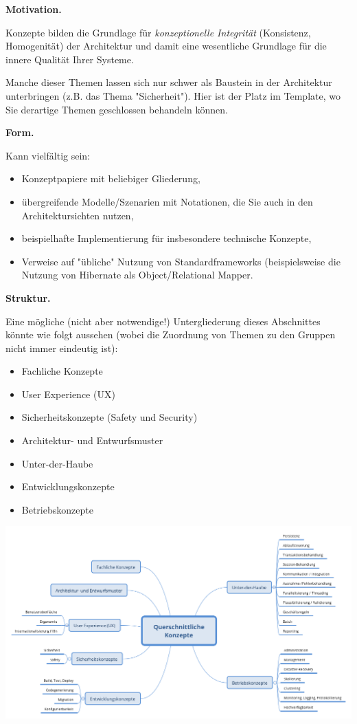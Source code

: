 \documentclass[]{article}
\begin{document}
\textbf{Motivation.}

Konzepte bilden die Grundlage für \emph{konzeptionelle Integrität}
(Konsistenz, Homogenität) der Architektur und damit eine wesentliche
Grundlage für die innere Qualität Ihrer Systeme.

Manche dieser Themen lassen sich nur schwer als Baustein in der
Architektur unterbringen (z.B. das Thema "Sicherheit"). Hier ist der
Platz im Template, wo Sie derartige Themen geschlossen behandeln können.

\textbf{Form.}

Kann vielfältig sein:

\begin{itemize}
\item
  Konzeptpapiere mit beliebiger Gliederung,
\item
  übergreifende Modelle/Szenarien mit Notationen, die Sie auch in den
  Architektursichten nutzen,
\item
  beispielhafte Implementierung für insbesondere technische Konzepte,
\item
  Verweise auf "übliche" Nutzung von Standardframeworks (beispielsweise
  die Nutzung von Hibernate als Object/Relational Mapper.
\end{itemize}

\textbf{Struktur.}

Eine mögliche (nicht aber notwendige!) Untergliederung dieses
Abschnittes könnte wie folgt aussehen (wobei die Zuordnung von Themen zu
den Gruppen nicht immer eindeutig ist):

\begin{itemize}
\item
  Fachliche Konzepte
\item
  User Experience (UX)
\item
  Sicherheitskonzepte (Safety und Security)
\item
  Architektur- und Entwurfsmuster
\item
  Unter-der-Haube
\item
  Entwicklungskonzepte
\item
  Betriebskonzepte
\end{itemize}

\includegraphics{images/08-Crosscutting-Concepts-Structure-DE.png}
\end{document}
